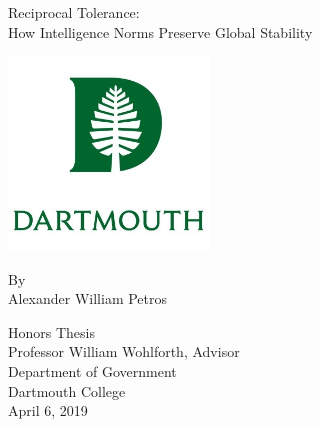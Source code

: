 
\begin{titlingpage}
\begin{center}
	\vspace*{0.5cm}
	\huge
	\SingleSpacing

	Reciprocal Tolerance:\\
	How Intelligence Norms Preserve Global Stability
	\vspace{1cm}

	\includegraphics[width=0.4\textwidth]{dartmouth-crest.jpg}

	\vspace{0.5cm}
	By\\
	Alexander William Petros



	\vfill
	\vspace{0.5cm}

	Honors Thesis\\
	Professor William Wohlforth, Advisor\\
	Department of Government\\
	Dartmouth College\\
	April 6, 2019

\end{center}
\end{titlingpage}
